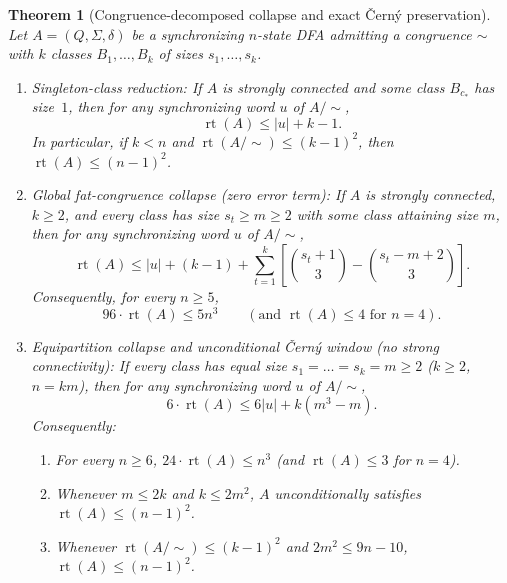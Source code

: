 \documentclass[11pt,a4paper]{article}
\newtheorem{theorem}{Theorem}[section]
\theoremstyle{definition}
\theoremstyle{remark}
\newcommand{\rt}{\operatorname{rt}}
\begin{document}
\begin{theorem}[Congruence-decomposed collapse and exact \v{C}ern\'y preservation]\label{thm:congruence-collapse}
Let $A = (Q, \Sigma, \delta)$ be a synchronizing $n$-state DFA admitting a congruence $\sim$ with $k$ classes $B_1, \dots, B_k$ of sizes $s_1, \dots, s_k$.
\begin{enumerate}[label=\textup{(\alph*)},leftmargin=*,nosep]
  \item \emph{Singleton-class reduction:} If $A$ is strongly connected and some class $B_{c_*}$ has size~$1$, then for any synchronizing word $u$ of $A/\sim$,
  \[
    \rt(A) \le |u| + k - 1.
  \]
  In particular, if $k < n$ and $\rt(A/\sim) \le (k - 1)^2$, then $\rt(A) \le (n - 1)^2$.

  \item \emph{Global fat-congruence collapse (zero error term):} If $A$ is strongly connected, $k \ge 2$, and every class has size $s_t \ge m \ge 2$ with some class attaining size $m$, then for any synchronizing word $u$ of $A/\sim$,
  \[
    \rt(A) \le |u| + (k - 1) + \sum_{t = 1}^k \left[\binom{s_t + 1}{3} - \binom{s_t - m + 2}{3}\right].
  \]
  Consequently, for every $n \ge 5$,
  \[
    96 \cdot \rt(A) \le 5 n^3 \qquad \left(\text{and } \rt(A) \le 4 \text{ for } n = 4\right).
  \]

  \item \emph{Equipartition collapse and unconditional \v{C}ern\'y window (no strong connectivity):} If every class has equal size $s_1 = \dots = s_k = m \ge 2$ ($k \ge 2$, $n = km$), then for any synchronizing word $u$ of $A/\sim$,
  \[
    6 \cdot \rt(A) \le 6 |u| + k(m^3 - m).
  \]
  Consequently:
  \begin{enumerate}[label=\textup{(\roman*)},nosep]
    \item For every $n \ge 6$, $24 \cdot \rt(A) \le n^3$ (and $\rt(A) \le 3$ for $n = 4$).
    \item Whenever $m \le 2k$ and $k \le 2m^2$, $A$ unconditionally satisfies $\rt(A) \le (n - 1)^2$.
    \item Whenever $\rt(A/\sim) \le (k - 1)^2$ and $2m^2 \le 9n - 10$, $\rt(A) \le (n - 1)^2$.
  \end{enumerate}
\end{enumerate}
\end{theorem}
\end{document}
